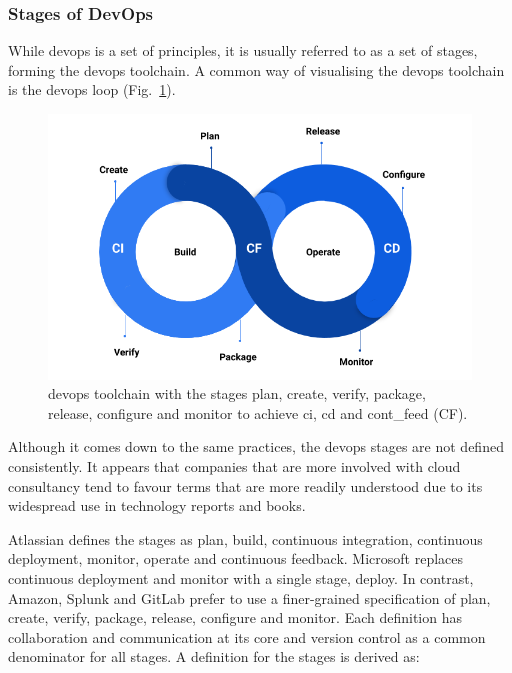 \documentclass[../main.tex]{subfiles}
\begin{document}
    \subsubsection{Stages of DevOps}
    \label{subsubsec:defs-toolchain}

    While \gls{devops} is a set of principles, it is usually referred to as a set of stages, forming the \gls{devops} toolchain.
    A common way of visualising the \gls{devops} toolchain is the \gls{devops} loop (Fig.~\ref{fig:devops_loop}).

    \begin{figure}[h]
        \centering
        \includegraphics[width=.99\linewidth]{img/def_devops_loop_v3.png}
        \captionsetup{justification=centering}
        \caption{
            \gls{devops} toolchain with the stages plan, create, verify, package, release, configure and monitor to achieve \acrfull{ci}, \acrfull{cd} and \gls{cont_feed} (CF).
        }
        \label{fig:devops_loop}
    \end{figure}

    Although it comes down to the same practices, the \gls{devops} stages are not defined consistently.
    It appears that companies that are more involved with \gls{cloud} consultancy tend to favour terms that are more readily understood due to its widespread use in technology reports and books.

    Atlassian defines the stages as plan, build, continuous integration, continuous deployment, monitor, operate and continuous feedback.
    Microsoft replaces continuous deployment and monitor with a single stage, deploy.
    In contrast, Amazon, Splunk and GitLab prefer to use a finer-grained specification of plan, create, verify, package, release, configure and monitor.
    Each definition has collaboration and communication at its core and version control as a common denominator for all stages.
    A definition for the stages is derived as\cite{what_is_devops_atlassian,what_is_devops_microsoft,what_is_devops_aws,what_is_devops_splunk,what_is_devops_gitlab}:
\end{document}
